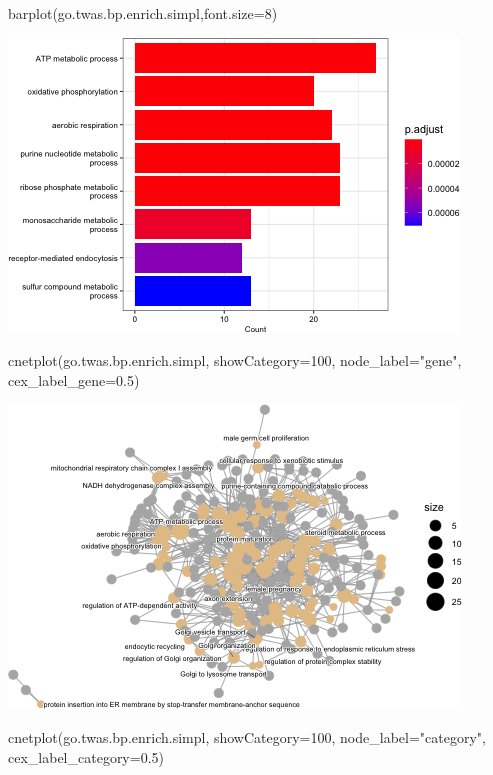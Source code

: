 \documentclass[
]{article}
\newenvironment{Shaded}{\begin{snugshade}}{\end{snugshade}}
\newcommand{\AttributeTok}[1]{\textcolor[rgb]{0.77,0.63,0.00}{#1}}
\newcommand{\DecValTok}[1]{\textcolor[rgb]{0.00,0.00,0.81}{#1}}
\newcommand{\FloatTok}[1]{\textcolor[rgb]{0.00,0.00,0.81}{#1}}
\newcommand{\FunctionTok}[1]{\textcolor[rgb]{0.00,0.00,0.00}{#1}}
\newcommand{\NormalTok}[1]{#1}
\newcommand{\StringTok}[1]{\textcolor[rgb]{0.31,0.60,0.02}{#1}}
\begin{document}
\begin{Shaded}
\begin{Highlighting}[]
\FunctionTok{barplot}\NormalTok{(go.twas.bp.enrich.simpl,}\AttributeTok{font.size=}\DecValTok{8}\NormalTok{)}
\end{Highlighting}
\end{Shaded}

\includegraphics{figures/twas-go-2.png}

\begin{Shaded}
\begin{Highlighting}[]
\FunctionTok{cnetplot}\NormalTok{(go.twas.bp.enrich.simpl, }
         \AttributeTok{showCategory=}\DecValTok{100}\NormalTok{,}
         \AttributeTok{node\_label=}\StringTok{"gene"}\NormalTok{,}
         \AttributeTok{cex\_label\_gene=}\FloatTok{0.5}\NormalTok{)}
\end{Highlighting}
\end{Shaded}

\includegraphics{figures/twas-go-3.png}

\begin{Shaded}
\begin{Highlighting}[]
\FunctionTok{cnetplot}\NormalTok{(go.twas.bp.enrich.simpl, }
         \AttributeTok{showCategory=}\DecValTok{100}\NormalTok{,}
         \AttributeTok{node\_label=}\StringTok{"category"}\NormalTok{,}
         \AttributeTok{cex\_label\_category=}\FloatTok{0.5}\NormalTok{)}
\end{Highlighting}
\end{Shaded}
\end{document}
